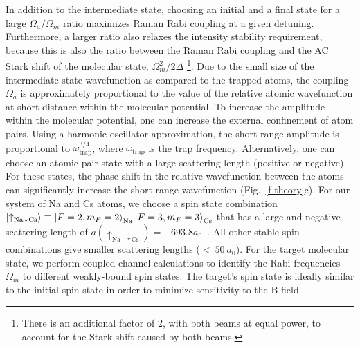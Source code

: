 \documentclass[aps,prl,twocolumn,10pt,superscriptaddress]{revtex4-1}
\newcommand{\Na}{\mathrm{Na}}
\newcommand{\Cs}{\mathrm{Cs}}
\begin{document}
In addition to the intermediate state,
choosing an initial and a final state for a large $ \Omega_a/\Omega_m $ ratio
maximizes Raman Rabi coupling at a given detuning.
Furthermore, a larger ratio also relaxes the intensity stability requirement,
because this is also the ratio between the Raman Rabi coupling
and the AC Stark shift of the molecular state, $\Omega_m^2 / 2\Delta$
\footnote{There is an additional factor of 2, with both beams at equal power,
  to account for the Stark shift caused by both beams.}.
Due to the small size of the intermediate state wavefunction as compared to the trapped atoms,
the coupling $\Omega_a$ is approximately proportional to
the value of the relative atomic wavefunction at short distance
within the molecular potential.
To increase the amplitude within the molecular potential,
one can increase the external confinement of atom pairs.
Using a harmonic oscillator approximation,
the short range amplitude is proportional to $ \omega_{\text{trap}}^{3/4} $,
where $ \omega_{\text{trap}} $ is the trap frequency\cite{Mies2000}.
Alternatively, one can choose an atomic pair state with a large scattering length
(positive or negative).
For these states, the phase shift in the relative wavefunction
between the atoms can significantly increase the short range wavefunction (Fig.~\ref{f-theory}c).
For our system of Na and Cs atoms,
we choose a spin state combination $\ket{\uparrow_{\Na} \downarrow_{\Cs}}\equiv \ket{F=2,m_F=2}_{\Na}\ket{F=3,m_F=3}_{\Cs}$ that has a large and negative scattering length of
$ a(\uparrow_{\Na} \downarrow_{\Cs}) = -693.8a_0$~\cite{Hood2019}.
All other stable spin combinations give smaller scattering lengths ($<~50~a_0$).
For the target molecular state, we perform coupled-channel calculations
to identify the Rabi frequencies $\Omega_m$ to different weakly-bound spin states. The target's spin state is ideally similar to the initial spin state in order to minimize sensitivity to the B-field.
\end{document}
